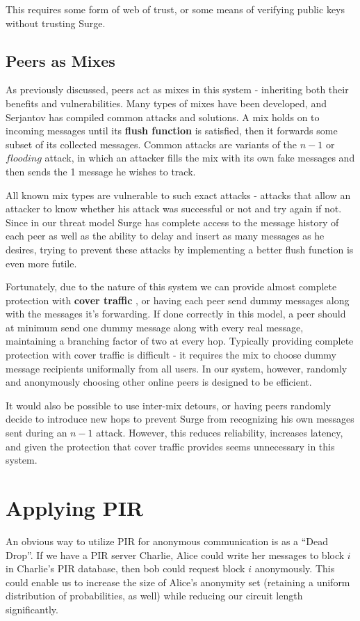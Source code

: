 \documentclass{paper}
\begin{document}
This requires some form of web of trust, or some means of verifying public keys without trusting Surge. 

\subsection{Peers as Mixes}
As previously discussed, peers act as mixes in this system - inheriting both their benefits and vulnerabilities. Many types of mixes have been developed, and Serjantov \cite{trickle02} has compiled common attacks and solutions. 
A mix holds on to incoming messages until its \textbf{flush function} is satisfied, then it forwards some subset of its collected messages. Common attacks are variants of the $n - 1$ or $flooding$ attack, in which an attacker fills the mix with its own fake messages and then sends the 1 message he wishes to track. 

All known mix types are vulnerable to such exact attacks \cite{trickle02} -  attacks that allow an attacker to know whether his attack was successful or not and try again if not. Since in our threat model Surge has complete access to the message history of each peer as well as the ability to delay and insert as many messages as he desires, trying to prevent these attacks by implementing a better flush function is even more futile. 

Fortunately, due to the nature of this system we can provide almost complete protection with \textbf{cover traffic} \cite{trickle02}, or having each peer send dummy messages along with the messages it's forwarding. If done correctly in this model, a peer should at minimum send one dummy message along with every real message, maintaining a branching factor of two at every hop. Typically providing complete protection with cover traffic is difficult - it requires the mix to choose dummy message recipients uniformally from all users. In our system, however, randomly and anonymously choosing other online peers is designed to be efficient.

It would also be possible to use inter-mix detours\cite{TODO}, or having peers randomly decide to introduce new hops to prevent Surge from recognizing his own messages sent during an $n - 1$ attack. However, this reduces reliability, increases latency, and given the protection that cover traffic provides seems unnecessary in this system. 

\section{Applying PIR}
An obvious way to utilize PIR for anonymous communication is as a ``Dead Drop''. If we have a PIR server Charlie, Alice could write her messages to block $i$ in Charlie's PIR database, then bob could request block $i$ anonymously. This could enable us to increase the size of Alice's anonymity set (retaining a uniform distribution of probabilities, as well) while reducing our circuit length significantly. 
\end{document}
